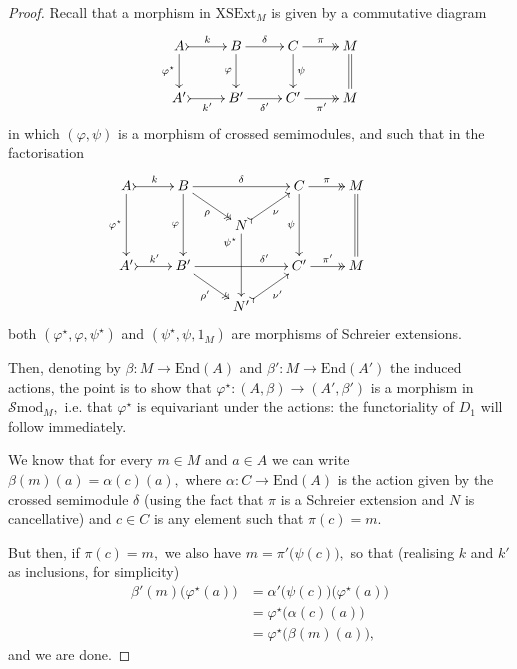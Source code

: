 \documentclass[a4paper]{amsart}
\theoremstyle{plain}
\theoremstyle{definition}
\theoremstyle{remark}
\begin{document}
\begin{proof}
Recall that a morphism in $\mathrm{XSExt}_M$ is given by a commutative diagram
\begin{equation*}
\xymatrix{
A \ar@{>->}[r]^-k \ar[d]_-{\varphi^\star} &B \ar[r]^-{\delta} \ar[d]_-{\varphi} &C \ar@{->>}[r]^-{\pi} \ar[d]^-{\psi} &M\ar@{=}[d]  \\
{A'} \ar@{>->}[r]_-{k'} &{B'} \ar[r]_-{\delta'} &{C'} \ar@{->>}[r]_-{\pi'} &M
}
\end{equation*}
in which $(\varphi,\psi)$ is a morphism of crossed semimodules, and such that in the factorisation
\begin{equation*}
\xymatrixrowsep{1.3pc}
\xymatrix{
A \ar[dd]_-{\varphi^\star} \ar@{>->}[r]^-k &B \ar[dd]_-{\varphi} \ar@{->>}[rd]_-{\rho} \ar[rr]^-{\delta} & \ &C  \ar[dd]_-{\psi} \ar@{->>}[r]^-{\pi} &{M}  \ar@{=}[dd] \\
 &\ &N \ar[dd]_(.20){\psi^\star} \ar@{>->}[ru]_-{\nu}&\ &\ &\ \\
{A'} \ar@{>->}[r]^-{k'} &{B'} \ar@{->>}[rd]_-{\rho'} \ar[rr]^(.70){\delta'} & \ &{C'} \ar@{->>}[r]^-{\pi'} &{M} \\
 &\ &{N'} \ar@{>->}[ru]_-{\nu'}&\ &\ &\
}
\end{equation*}
both $(\varphi^\star,\varphi,\psi^\star)$ and $(\psi^\star,\psi,1_M)$ are morphisms of Schreier extensions.

Then, denoting by $\beta\colon M\longrightarrow\mathrm{End}(A)$ and $\beta'\colon M\longrightarrow\mathrm{End}(A')$ the induced actions, the point is to show that $\varphi^\star\colon (A,\beta)\longrightarrow(A',\beta')$ is a morphism in $\mathcal{S}\mathrm{mod}_M,$ i.e. that $\varphi^\star$ is equivariant under the actions: the functoriality of $D_1$ will follow immediately.

We know that for every $m\in M$ and $a\in A$ we can write $\beta(m)(a)=\alpha(c)(a),$ where $\alpha\colon C\longrightarrow\mathrm{End}(A)$ is the action given by the crossed semimodule $\delta$ (using the fact that $\pi$ is a Schreier extension and $N$ is cancellative) and $c\in C$ is any element such that $\pi(c)=m.$

But then, if $\pi(c)=m,$ we also have $m=\pi'\big(\psi(c)\big),$ so that (realising $k$ and $k'$ as inclusions, for simplicity)
\begin{equation*}
\begin{split}
\beta'(m)\big(\varphi^\star(a)\big)&=\alpha'\big(\psi(c)\big)\big(\varphi^\star(a)\big)\\
&=\varphi^\star\big(\alpha(c)(a)\big)\\
&=\varphi^\star\big(\beta(m)(a)\big),
\end{split}
\end{equation*}
and we are done.


\end{proof}
\end{document}

